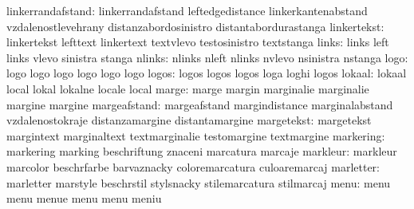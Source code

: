         linkerrandafstand: linkerrandafstand         leftedgedistance
                           linkerkantenabstand       vzdalenostlevehrany
                           distanzabordosinistro     distantabordurastanga
              linkertekst: linkertekst               lefttext
                           linkertext                textvlevo
                           testosinistro             textstanga %
                    links: links                     left
                           links                     vlevo
                           sinistra                  stanga
                   nlinks: nlinks                    nleft
                           nlinks                    nvlevo
                           nsinistra                 nstanga
                     logo: logo                      logo
                           logo                      logo
                           logo                      logo
                    logos: logos                     logos
                           logos                     loga
                           loghi                     logos
                   lokaal: lokaal                    local
                           lokal                     lokalne
                           locale                    local
                    marge: marge                     margin
                           marginalie                marginalie
                           margine                   margine
             margeafstand: margeafstand              margindistance
                           marginalabstand           vzdalenostokraje
                           distanzamargine           distantamargine
               margetekst: margetekst                margintext
                           marginaltext              textmarginalie
                           testomargine              textmargine
                markering: markering                 marking
                           beschriftung              znaceni
                           marcatura                 marcaje
                 markleur: markleur                  marcolor
                           beschrfarbe               barvaznacky
                           coloremarcatura           culoaremarcaj
                marletter: marletter                 marstyle
                           beschrstil                stylsnacky
                           stilemarcatura            stilmarcaj
                     menu: menu                      menu
                           menue                     menu
                           menu                      meniu
